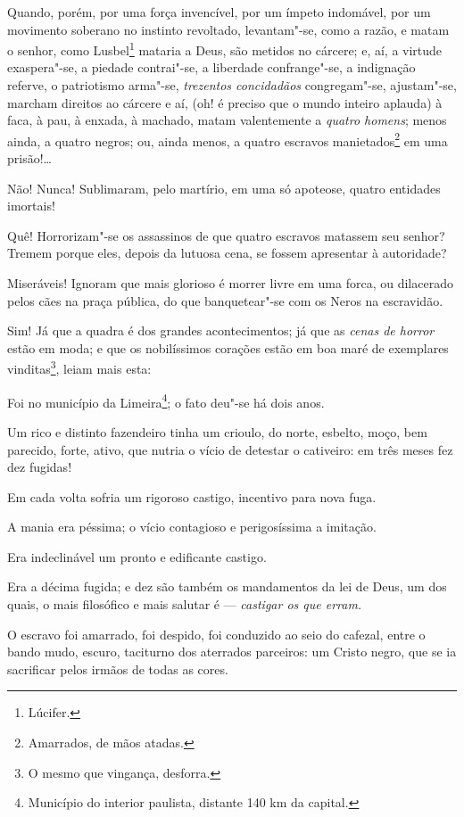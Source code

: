 Quando, porém, por uma força invencível, por um ímpeto indomável, por um
movimento soberano no instinto revoltado, levantam"-se, como a razão, e
matam o senhor, como Lusbel\footnote{Lúcifer.} mataria a Deus, são
metidos no cárcere; e, aí, a virtude exaspera"-se, a piedade contrai"-se,
a liberdade confrange"-se, a indignação referve, o patriotismo arma"-se,
\emph{trezentos concidadãos} congregam"-se, ajustam"-se, marcham direitos
ao cárcere e aí, (oh! é preciso que o mundo inteiro aplauda) à faca, à
pau, à enxada, à machado, matam valentemente a \emph{quatro homens};
menos ainda, a quatro negros; ou, ainda menos, a quatro escravos
manietados\footnote{Amarrados, de mãos atadas.} em uma prisão!\ldots{}

Não! Nunca! Sublimaram, pelo martírio, em uma só apoteose, quatro
entidades imortais!

Quê! Horrorizam"-se os assassinos de que quatro escravos matassem seu
senhor? Tremem porque eles, depois da lutuosa cena, se fossem apresentar
à autoridade?

Miseráveis! Ignoram que mais glorioso é morrer livre em uma forca, ou
dilacerado pelos cães na praça pública, do que banquetear"-se com os
Neros na escravidão.

Sim! Já que a quadra é dos grandes acontecimentos; já que as \emph{cenas
de horror} estão em moda; e que os nobilíssimos corações estão em boa
maré de exemplares vinditas\footnote{O mesmo que vingança, desforra.},
leiam mais esta:

Foi no município da Limeira\footnote{Município do interior paulista,
  distante 140 km da capital.}; o fato deu"-se há dois anos.

Um rico e distinto fazendeiro tinha um crioulo, do norte, esbelto, moço,
bem parecido, forte, ativo, que nutria o vício de detestar o cativeiro:
em três meses fez dez fugidas!

Em cada volta sofria um rigoroso castigo, incentivo para nova fuga.

A mania era péssima; o vício contagioso e perigosíssima a imitação.

Era indeclinável um pronto e edificante castigo.

Era a décima fugida; e dez são também os mandamentos da lei de Deus, um
dos quais, o mais filosófico e mais salutar é --- \emph{castigar os que
erram.}

O escravo foi amarrado, foi despido, foi conduzido ao seio do cafezal,
entre o bando mudo, escuro, taciturno dos aterrados parceiros: um Cristo
negro, que se ia sacrificar pelos irmãos de todas as cores.

